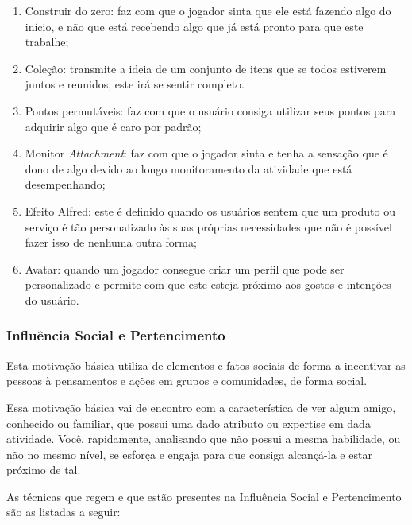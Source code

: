 \begin{enumerate}
    \item Construir do zero: faz com que o jogador sinta que ele está
        fazendo algo do início, e não que está recebendo algo que
        já está pronto para que este trabalhe;
    \item Coleção: transmite a ideia de um conjunto de itens que se todos
        estiverem juntos e reunidos, este irá se sentir completo.
    \item Pontos permutáveis: faz com que o usuário consiga utilizar
        seus pontos para adquirir algo que é caro por padrão;
    \item Monitor \textit{Attachment}: faz com que o jogador sinta e tenha a
        sensação que é dono de algo devido ao longo monitoramento
        da atividade que está desempenhando;
    \item Efeito Alfred: este é definido quando os usuários
        sentem que um produto ou serviço é tão personalizado às
        suas próprias necessidades que não é possível fazer isso
        de nenhuma outra forma;
    \item Avatar: quando um jogador consegue criar um perfil que pode ser
        personalizado e permite com que este esteja próximo aos gostos e
        intenções do usuário.
\end{enumerate}

\subsubsection{Influência Social e Pertencimento}
\label{sub:influenciasocialepertencimento}
Esta motivação básica utiliza de elementos e fatos sociais de forma
a incentivar as pessoas à pensamentos e ações em grupos e comunidades,
de forma social.

Essa motivação básica vai de encontro com a característica de ver algum
amigo, conhecido ou familiar, que possui uma dado atributo ou expertise
em dada atividade. Você, rapidamente, analisando que não possui a mesma
habilidade, ou não no mesmo nível, se esforça e engaja para que consiga
alcançá-la e estar próximo de tal.

As técnicas que regem e que estão presentes na Influência Social e Pertencimento
são as listadas a seguir:


